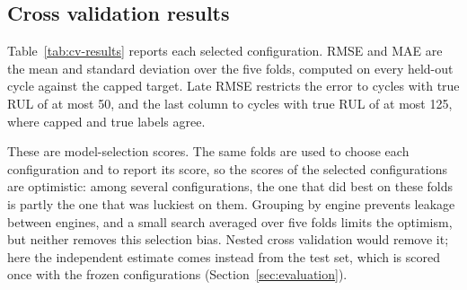 \subsection{Cross validation results}
Table~\ref{tab:cv-results} reports each selected configuration. RMSE and
MAE are the mean and standard deviation over the five folds, computed on
every held-out cycle against the capped target. Late RMSE restricts the
error to cycles with true RUL of at most 50, and the last column to cycles
with true RUL of at most 125, where capped and true labels agree.

These are model-selection scores. The same folds are used to choose each
configuration and to report its score, so the scores of the selected
configurations are optimistic: among several configurations, the one that
did best on these folds is partly the one that was luckiest on them.
Grouping by engine prevents leakage between engines, and a small search
averaged over five folds limits the optimism, but neither removes this
selection bias. Nested cross validation would remove it; here the
independent estimate comes instead from the test set, which is scored once
with the frozen configurations (Section~\ref{sec:evaluation}).

